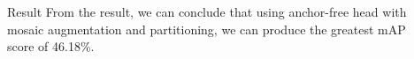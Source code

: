 \documentclass[final,hyperref={pdfpagelabels=false}]{beamer}
\begin{document}
\begin{frame}[t]
\begin{columns}[t]
\begin{column}{.465\textwidth}
\begin{block}{Result}
From the result, we can conclude that using anchor-free head with mosaic augmentation and partitioning, we can produce the greatest mAP score of 46.18\%.
\end{block}


% 
% 
% 
% 
% 
%
%
%


\end{column} %

\begin{column}{.015\textwidth}\end{column} %

\end{columns} %

\end{frame} %
\end{document}

